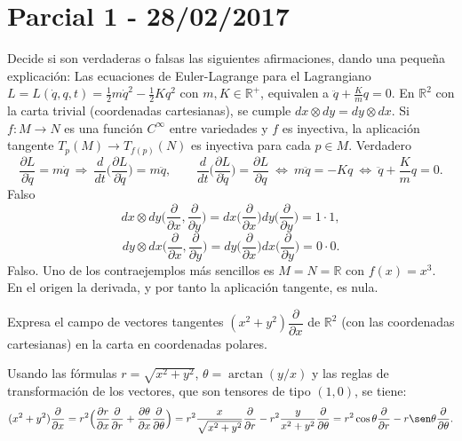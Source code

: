 \section{Parcial 1 - 28/02/2017}
\begin{problem}[1][3 puntos]Decide si son verdaderas o falsas las siguientes afirmaciones, dando una pequeña explicación:
	\ppart Las ecuaciones de Euler-Lagrange para el Lagrangiano $L=L(\dot{q},q,t)=\frac 12 m\dot{q}^2-\frac 12 Kq^2$ con $m,K\in\mathbb{R}^+$, equivalen a $\ddot{q}+\frac{K}{m}q=0$.
	\ppart En $ℝ^2$ con la carta trivial (coordenadas cartesianas), se cumple $dx\otimes dy=dy\otimes dx$.
	\ppart Si $f:M\longrightarrow N$ es una función $C^\infty$ entre variedades y $f$ es inyectiva, la aplicación tangente $T_p(M)\longrightarrow T_{f(p)}(N)$ es inyectiva para cada  $p\in M$. 
	\solution 
	\spart Verdadero $$\frac{\partial L}{\partial \dot{q}}
	=m\dot{q}\ \Rightarrow\ \frac{d}{dt}\Big(\frac{\partial L}{\partial \dot{q}}\Big)=m\ddot{q},\qquad \frac{d}{dt}\Big(\frac{\partial L}{\partial \dot{q}}\Big)=\frac{\partial L}{\partial {q}}\ \Leftrightarrow\ m\ddot{q}= -K q\ \Leftrightarrow\ \ddot{q}+\frac{K}{m}q=0.$$
	\spart Falso $$dx\otimes dy
	\Big(\frac{\partial}{\partial x},\frac{\partial}{\partial y}\Big)
	=
	dx
	\Big(\frac{\partial}{\partial x}\Big)
	dy
	\Big(\frac{\partial}{\partial y}\Big)
	=1\cdot 1,
	$$$$
	dy\otimes dx
	\Big(\frac{\partial}{\partial x},\frac{\partial}{\partial y}\Big)
	=
	dy
	\Big(\frac{\partial}{\partial x}\Big)
	dx
	\Big(\frac{\partial}{\partial y}\Big)
	=0\cdot 0.$$
	\spart Falso. Uno de los contraejemplos más sencillos es $M=N=ℝ$ con $f(x)=x^3$. En el origen la derivada, y por tanto la aplicación tangente, es nula. 
\end{problem}
\newpage
\begin{problem}[2][3 puntos] Expresa el campo de vectores tangentes $(x^2+y^2)\dfrac{\partial}{\partial x}$ de $ℝ^2$ (con las coordenadas cartesianas) en la carta en coordenadas polares. 
	
	\solution Usando las fórmulas $r=\sqrt{x^2+y^2}$, $\theta=\arctan(y/x)$ y las reglas de transformación de los vectores, que son tensores de tipo $(1,0)$, se tiene: $$(x^2+y^2)\frac{\partial}{\partial x}
	=
	r^2\Big(\frac{\partial r}{\partial x}
	\frac{\partial}{\partial r}
	+\frac{\partial \theta}{\partial x}
	\frac{\partial}{\partial \theta}\Big)
	=
	r^2\frac{x}{\sqrt{x^2+y^2}}
	\frac{\partial}{\partial r}
	-r^2\frac{y}{{x^2+y^2}}
	\frac{\partial}{\partial \theta}
	=
	r^2\cos\theta 
	\frac{\partial}{\partial r}
	-r\sen\theta
	\frac{\partial}{\partial \theta}.$$
	
\end{problem}
